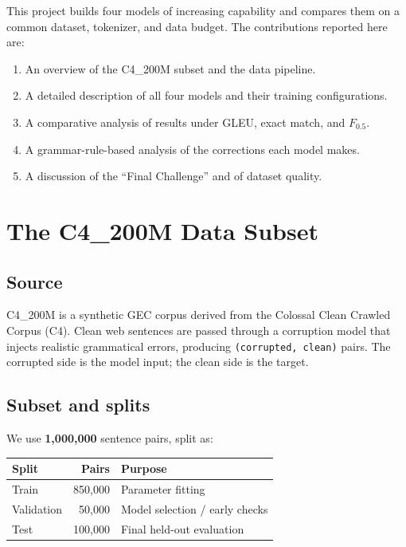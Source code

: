 \documentclass[11pt,a4paper]{article}
\begin{document}
This project builds four models of increasing capability and compares them on a
common dataset, tokenizer, and data budget. The contributions reported here are:

\begin{enumerate}[noitemsep]
  \item An overview of the C4\_200M subset and the data pipeline.
  \item A detailed description of all four models and their training configurations.
  \item A comparative analysis of results under GLEU, exact match, and $F_{0.5}$.
  \item A grammar-rule-based analysis of the corrections each model makes.
  \item A discussion of the ``Final Challenge'' and of dataset quality.
\end{enumerate}

\section{The C4\_200M Data Subset}
\subsection{Source}
C4\_200M is a synthetic GEC corpus derived from the Colossal Clean Crawled
Corpus (C4). Clean web sentences are passed through a corruption model that
injects realistic grammatical errors, producing \texttt{(corrupted, clean)}
pairs. The corrupted side is the model input; the clean side is the target.

\subsection{Subset and splits}
We use \textbf{1{,}000{,}000} sentence pairs, split as:

\begin{center}
\begin{tabular}{lrl}
\toprule
Split & Pairs & Purpose \\
\midrule
Train      & 850{,}000 & Parameter fitting \\
Validation & 50{,}000  & Model selection / early checks \\
Test       & 100{,}000 & Final held-out evaluation \\
\bottomrule
\end{tabular}
\end{center}
\end{document}

